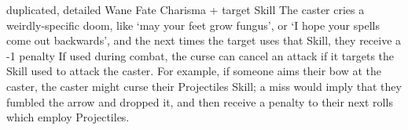   {duplicated, detailed}%
  {Wane}%
  {Fate}%
  {Charisma + target Skill}%
  {The caster cries a weirdly-specific doom, like `may your feet grow fungus', or `I hope your spells come out backwards', and the next  times the target uses that Skill, they receive a -1 penalty}%
  {If used during combat, the curse can cancel an attack if it targets the Skill used to attack the caster.
  For example, if someone aims their bow at the caster, the caster might curse their Projectiles Skill; a miss would imply that they fumbled the arrow and dropped it, and then receive a penalty to their next  rolls which employ Projectiles.}
